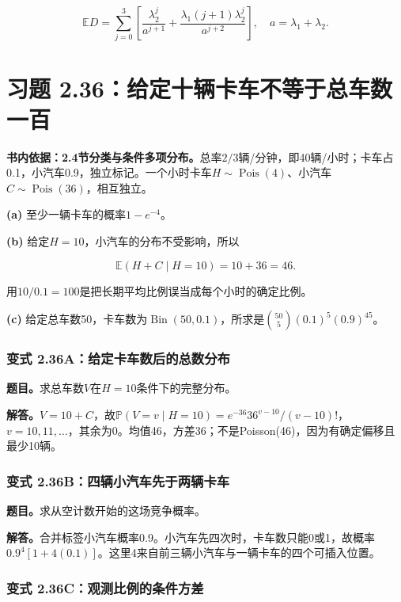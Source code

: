 \documentclass[12pt,a4paper,UTF8,fontset=fandol]{ctexart}
\begin{document}
\[\mathbb ED=\sum_{j=0}^3\left[\frac{\lambda_2^j}{a^{j+1}}+
\frac{\lambda_1(j+1)\lambda_2^j}{a^{j+2}}\right],\quad a=\lambda_1+\lambda_2.\]

\section{习题
2.36：给定十辆卡车不等于总车数一百}\label{ux4e60ux9898-2.36ux7ed9ux5b9aux5341ux8f86ux5361ux8f66ux4e0dux7b49ux4e8eux603bux8f66ux6570ux4e00ux767e}

\textbf{书内依据：2.4节分类与条件多项分布。}总率\(2/3\)辆/分钟，即40辆/小时；卡车占0.1，小汽车0.9，独立标记。一个小时卡车\(H\sim\operatorname{Pois}(4)\)、小汽车\(C\sim\operatorname{Pois}(36)\)，相互独立。

\textbf{(a)} 至少一辆卡车的概率\(\boxed{1-e^{-4}}\)。

\textbf{(b)} 给定\(H=10\)，小汽车的分布不受影响，所以

\[\boxed{\mathbb E(H+C\mid H=10)=10+36=46.}\]

用\(10/0.1=100\)是把长期平均比例误当成每个小时的确定比例。

\textbf{(c)}
给定总车数50，卡车数为\(\operatorname{Bin}(50,0.1)\)，所求是\(\boxed{\binom{50}5(0.1)^5(0.9)^{45}}\)。

\subsubsection{变式
2.36A：给定卡车数后的总数分布}\label{ux53d8ux5f0f-2.36aux7ed9ux5b9aux5361ux8f66ux6570ux540eux7684ux603bux6570ux5206ux5e03}

\textbf{题目。}求总车数\(V\)在\(H=10\)条件下的完整分布。

\textbf{解答。}\(V=10+C\)，故\(\mathbb P(V=v\mid H=10)=e^{-36}36^{v-10}/(v-10)!\)，\(v=10,11,\ldots\)，其余为0。均值46，方差36；不是Poisson(46)，因为有确定偏移且最少10辆。

\subsubsection{变式
2.36B：四辆小汽车先于两辆卡车}\label{ux53d8ux5f0f-2.36bux56dbux8f86ux5c0fux6c7dux8f66ux5148ux4e8eux4e24ux8f86ux5361ux8f66}

\textbf{题目。}求从空计数开始的这场竞争概率。

\textbf{解答。}合并标签小汽车概率0.9。小汽车先四次时，卡车数只能0或1，故概率\(0.9^4[1+4(0.1)]\)。这里4来自前三辆小汽车与一辆卡车的四个可插入位置。

\subsubsection{变式
2.36C：观测比例的条件方差}\label{ux53d8ux5f0f-2.36cux89c2ux6d4bux6bd4ux4f8bux7684ux6761ux4ef6ux65b9ux5dee}
\end{document}
